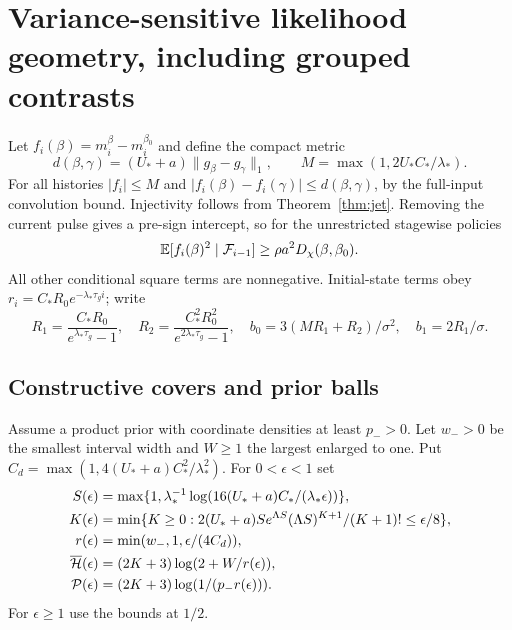 \section{Variance-sensitive likelihood geometry, including grouped contrasts}
\label{sec:likelihood}
Let $f_i(\beta)=m_i^\beta-m_i^{\beta_0}$ and define the compact metric
\[
 d(\beta,\gamma)=(U_*+a)\|g_\beta-g_\gamma\|_1,
 \qquad M=\max(1,2U_*C_*/\lambda_*).
\]
For all histories $|f_i|\le M$ and $|f_i(\beta)-f_i(\gamma)|\le d(\beta,\gamma)$,
by the full-input convolution bound. Injectivity follows from
Theorem~\ref{thm:jet}. Removing the current pulse gives a pre-sign intercept,
so for the unrestricted stagewise policies
\begin{equation}
 \mathbb E[f_i(\beta)^2\mid\mathcal F_{i-1}]
       \ge\rho a^2D_\chi(\beta,\beta_0).
 \label{eq:stage-floor}
\end{equation}
All other conditional square terms are nonnegative. Initial-state terms obey
$r_i=C_*R_0e^{-\lambda_*\tau_gi}$; write
\[
 R_1=\frac{C_*R_0}{e^{\lambda_*\tau_g}-1},\quad
 R_2=\frac{C_*^2R_0^2}{e^{2\lambda_*\tau_g}-1},\quad
 b_0=3(MR_1+R_2)/\sigma^2,\quad b_1=2R_1/\sigma.
\]

\subsection{Constructive covers and prior balls}
Assume a product prior with coordinate densities at least $p_->0$.
Let $w_->0$ be the smallest interval width and $W\ge1$ the largest enlarged
to one. Put $C_d=\max(1,4(U_*+a)C_*^2/\lambda_*^2)$. For $0<\epsilon<1$ set
\begin{align}
 S(\epsilon)&=\max\{1,\lambda_*^{-1}
       \log(16(U_*+a)C_*/(\lambda_*\epsilon))\},\notag\\
 K(\epsilon)&=\min\{K\ge0:2(U_*+a)S e^{\Lambda S}
                 (\Lambda S)^{K+1}/(K+1)!\le\epsilon/8\},\notag\\
 r(\epsilon)&=\min(w_-,1,\epsilon/(4C_d)),\notag\\
 \overline{\mathcal H}(\epsilon)&=(2K+3)\log(2+W/r(\epsilon)),\notag\\
 \mathcal P(\epsilon)&=(2K+3)\log(1/(p_-r(\epsilon))).
 \label{eq:entropy}
\end{align}
For $\epsilon\ge1$ use the bounds at $1/2$.

